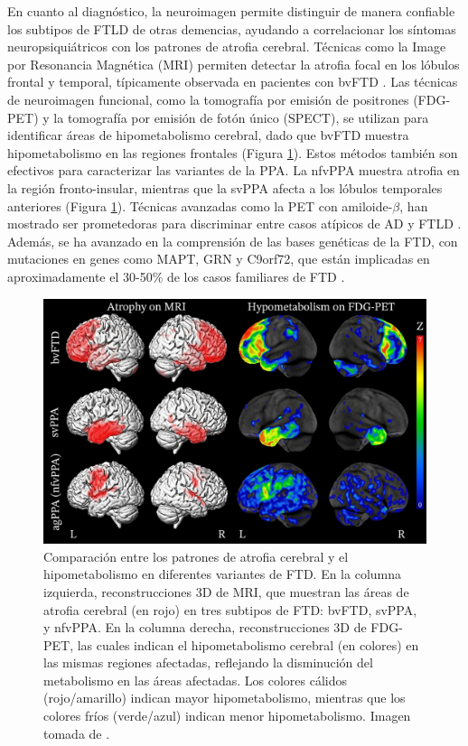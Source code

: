 En cuanto al diagnóstico, la neuroimagen permite distinguir de manera confiable los subtipos de FTLD de otras demencias, ayudando a correlacionar los síntomas neuropsiquiátricos con los patrones de atrofia cerebral. Técnicas como la Image por Resonancia Magnética (MRI) permiten detectar la atrofia focal en los lóbulos frontal y temporal, típicamente observada en pacientes con bvFTD \cite{gorno2011classification}. Las técnicas de neuroimagen funcional, como la tomografía por emisión de positrones (FDG-PET) y la tomografía por emisión de fotón único (SPECT), se utilizan para identificar áreas de hipometabolismo cerebral, dado que bvFTD muestra hipometabolismo en las regiones frontales \cite{varma2002spect, kanda2008fdgpet} (Figura \ref{fig:comparacion_imagenes_diagnostico}). Estos métodos también son efectivos para caracterizar las variantes de la PPA. La nfvPPA muestra atrofia en la región fronto-insular, mientras que la svPPA afecta a los lóbulos temporales anteriores \cite{gorno2011classification} (Figura \ref{fig:comparacion_imagenes_diagnostico}). Técnicas avanzadas como la PET con amiloide-\(\beta\), han mostrado ser prometedoras para discriminar entre casos atípicos de AD y FTLD \cite{rowe2007imagingamiloid}. Además, se ha avanzado en la comprensión de las bases genéticas de la FTD, con mutaciones en genes como MAPT, GRN y C9orf72, que están implicadas en aproximadamente el 30-50\% de los casos familiares de FTD \cite{sirkis2019recentgenes}.




\begin{figure}[h]
	\centering
	\includegraphics[width=0.75\linewidth]{figures/introduction/differences.jpg}
	\caption{Comparación entre los patrones de atrofia cerebral y el hipometabolismo en diferentes variantes de FTD. En la columna izquierda, reconstrucciones 3D de MRI, que muestran las áreas de atrofia cerebral (en rojo) en tres subtipos de FTD: bvFTD, svPPA, y nfvPPA. En la columna derecha, reconstrucciones 3D de FDG-PET, las cuales indican el hipometabolismo cerebral (en colores) en las mismas regiones afectadas, reflejando la disminución del metabolismo en las áreas afectadas. Los colores cálidos (rojo/amarillo) indican mayor hipometabolismo, mientras que los colores fríos (verde/azul) indican menor hipometabolismo. Imagen tomada de \cite{peet2021neuroimaging}.}
	\label{fig:comparacion_imagenes_diagnostico}
\end{figure}